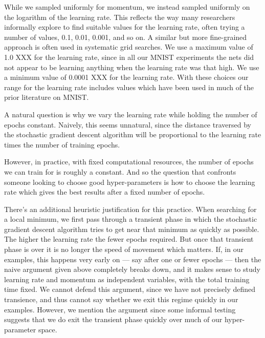\documentclass[10pt]{article}
\begin{document}
While we sampled uniformly for momentum, we instead sampled uniformly
on the logarithm of the learning rate.  This reflects the way many
researchers informally explore to find suitable values for the
learning rate, often trying a number of values, 0.1, 0.01, 0.001, and
so on.  A similar but more fine-grained approach is often used in
systematic grid searches.  We use a maximum value of 1.0 XXX for the
learning rate, since in all our MNIST experiments the nets did not
appear to be learning anything when the learning rate was that high.
We use a minimum value of 0.0001 XXX for the learning rate.  With
these choices our range for the learning rate includes values which
have been used in much of the prior literature on MNIST.

A natural question is why we vary the learning rate while holding the
number of epochs constant.  Naively, this seems unnatural, since the
distance traversed by the stochastic gradient descent algorithm will
be proportional to the learning rate times the number of training
epochs.

However, in practice, with fixed computational resources, the number
of epochs we can train for is roughly a constant.  And so the question
that confronts someone looking to choose good hyper-parameters is how
to choose the learning rate which gives the best results after a fixed
number of epochs.

There's an additional heuristic justification for this practice. When
searching for a local minimum, we first pass through a transient phase
in which the stochastic gradient descent algorithm tries to get near
that minimum as quickly as possible.  The higher the learning rate the
fewer epochs required.  But once that transient phase is over it is no
longer the speed of movement which matters.  If, in our examples, this
happens very early on --- say after one or fewer epochs --- then the
naive argument given above completely breaks down, and it makes sense
to study learning rate and momentum as independent variables, with the
total training time fixed.  We cannot defend this argument, since we
have not precisely defined transience, and thus cannot say whether we
exit this regime quickly in our examples.  However, we mention the
argument since some informal testing suggests that we do exit the
transient phase quickly over much of our hyper-parameter space.
\end{document}
